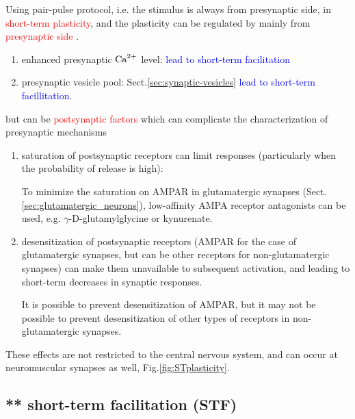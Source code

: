 Using pair-pulse protocol, i.e. the stimulus is always from presynaptic side, in
\textcolor{red}{short-term plasticity}, and the plasticity can be regulated by
mainly from \textcolor{red}{presynaptic side} \citep{fioravante2011,
regehr2012}.
\begin{enumerate}
  \item enhanced presynaptic ${\text{Ca}^{2+}}$ level: \textcolor{blue}{lead to short-term
  facilitation}
  
  \item presynaptic vesicle pool: Sect.\ref{sec:synaptic-vesicles}
    \textcolor{blue}{lead to short-term facillitation}.
    
\end{enumerate}
but can be \textcolor{red}{postsynaptic factors} which can complicate
the characterization of presynaptic mechanisms 
\begin{enumerate}
    \item saturation of postsynaptic receptors can limit responses
    (particularly when the probability of release is high):
    
To minimize the saturation on AMPAR in glutamatergic synapses
(Sect.\ref{sec:glutamatergic_neurons}), low-affinity AMPA receptor antagonists
can be used, e.g. $\gamma$-D-glutamylglycine or kynurenate.
    
    \item desensitization of postsynaptic receptors (AMPAR for the case of
    glutamatergic synapses, but can be other receptors for non-glutamatergic
    synapses) can make them unavailable to subsequent activation, and leading to
    short-term decreases in synaptic responses.
    
It is possible to prevent desensitization of AMPAR, but it may not be possible
to prevent desensitization of other types of receptors in non-glutamatergic
synapses.
\end{enumerate}
These effects are not restricted to the central nervous system, and can occur at
neuromuscular synapses as well, Fig.\ref{fig:STplasticity}.

\subsection{** short-term facilitation (STF)}
\label{sec:pair-pulse-facilitation}
\label{sec:short-term-facilitation}

